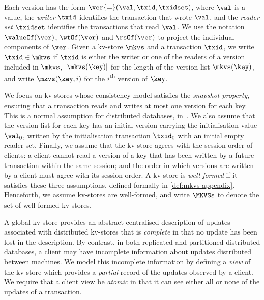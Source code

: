 Each version has the form 
$\ver {=} (\val, \txid, \txidset)$, where $\val$ is
a value, the \emph{writer} $\txid$ identifies the transaction that
wrote $\val$,  and the \emph{reader set} $\txidset$ identifies the
transactions that read $\val$. We use the notation 
$\valueOf(\ver)$,
$\wtOf(\ver)$ and $\rsOf(\ver)$ to project
the individual components of $\ver$.
Given a kv-store $\mkvs$ and a transaction $\txid$, we write 
$\txid \in \mkvs$ if $\txid$ is either the writer or 
one of the readers of a version included in $\mkvs$, 
$\lvert \mkvs(\key) \rvert$ for the length of the version
list $\mkvs(\key)$,
and write $\mkvs(\key, i)$ for the $i$\textsuperscript{th} version of $\key$.


We focus on kv-stores whose consistency model satisfies the
\emph{snapshot property}, ensuring that
a transaction reads and writes at most one version for each key.
This is a normal assumption for distributed databases, \eg in~\cite{ramp,rola,cops,wren,redblue,PSI,NMSI,gdur,clocksi,distrsi}.
We also assume that 
the version list for each key has an initial version 
carrying the initialisation value $\val_0$,  written by the 
initialisation transaction $\txid_0$ with an initial empty reader set.
Finally, we assume that the kv-store agrees with the session order of clients: 
a client cannot read a
version of a key that has been written by a future transaction within
the same session; and the order in which versions are written by a
client must agree with its session order.  A kv-store is
\emph{well-formed} if it satisfies these three assumptions, defined
formally in \cref{def:mkvs-appendix}.  Henceforth, we assume kv-stores
are well-formed, and write $\MKVSs$ to denote the set of well-formed
kv-stores.

A global kv-store provides an abstract centralised description of
updates associated with distributed kv-stores that is \emph{complete} in 
that no update has been lost in the description. By contrast, in
both replicated and partitioned distributed databases, a client may
have incomplete information about updates distributed between
machines.  We model this incomplete information by
defining a {\em view} of the kv-store which provides a {\em
  partial} record of the updates observed by a client. We require that a client view be {\em atomic} in that it can
see either all or none of the updates of a transaction.



